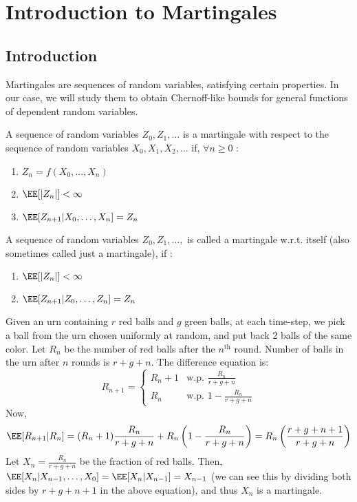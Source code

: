 \chapter{Introduction to Martingales}
\section{Introduction}
Martingales are sequences of random variables, satisfying certain properties. In our case, we will study them to obtain Chernoff-like bounds for general functions of dependent random variables.
\begin{definition}[Martingales]
A sequence of random variables $Z_0, Z_1, \dots$ is a martingale with respect to the sequence of random variables $X_0, X_1, X_2, \dots$ if, $\forall n \geq 0$ :
\begin{enumerate}[label=(\roman*)]
    \item $Z_n = f(X_0, \dots, X_n)$
    \item $\EE[|Z_n|] < \infty$
    \item $\EE[Z_{n+1} | X_0, \dots ,X_n] = Z_n$
\end{enumerate}
\end{definition}
\begin{definition}
A sequence of random variables $Z_0, Z_1, \dots,$ is called a martingale w.r.t. itself (also sometimes called just a martingale), if :
\begin{enumerate}[label=(\roman*)]
    \item $\EE[|Z_n|] < \infty$
    \item $\EE[Z_{n+1} | Z_0, \dots, Z_n] = Z_n$
\end{enumerate}
\end{definition}
\begin{eg}
Given an urn containing $r$ red balls and $g$ green balls, at each time-step, we pick a ball from the urn chosen uniformly at random, and put back 2 balls of the same color. Let $R_n$ be the number of red balls after the $n^\text{th}$ round. Number of balls in the urn after $n$ rounds is $r + g + n$. The difference equation is:
\[
R_{n+1} = \begin{cases}
    R_n + 1 & \text{w.p. } \frac{R_n}{r+g+n}  \\ R_n &\text{w.p. } 1-\frac{R_n}{r+g+n}
\end{cases}
\]
Now,
\[
\EE[R_{n+1} | R_n] = (R_n+1) \frac{R_n}{r+g+n} + R_n\left(1-\frac{R_n}{r+g+n}\right) = R_n\left(\frac{r+g+n+1}{r+g+n}\right)
\]
Let $X_n = \frac{R_n}{r+g+n}$ be the fraction of red balls. Then, $\EE[X_n|X_{n-1}, \dots, X_0] = \EE[X_n|X_{n-1}] = X_{n-1}$ (we can see this by dividing both sides by $r+g+n+1$ in the above equation), and thus $X_{n}$ is a martingale.
\end{eg}
